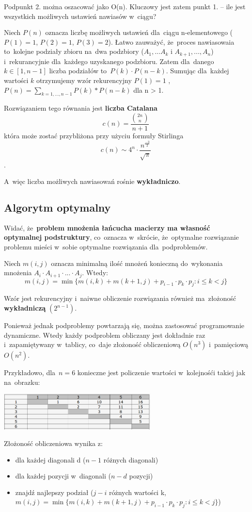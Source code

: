 Podpunkt 2. można oszacować jako O(n). Kluczowy jest zatem punkt 1. -- ile jest wszystkich możliwych ustawień nawiasów w~ciągu? 

Niech $P(n)$ oznacza liczbę możliwych ustawień dla~ciągu n-elementowego ($P(1) = 1$, $P(2) = 1$, $P(3) = 2$). Łatwo zauważyć, że~proces nawiasowaia to~kolejne podziały zbioru na~dwa podzbiory ($A_1,...A_k$ i $A_{k+1},...,A_n$) i~rekurancyjnie dla~każdego uzyskanego podzbioru. Zatem dla~danego $k \in [1, n-1]$ liczba podziałów to~$P(k) \cdot P(n - k)$. Sumując dla~każdej wartości $k$ otrzymujemy wzór rekurencyjny $P(1) = 1$ , $P(n) = \sum_{k=1,...,n-1} P(k) * P(n - k)$ dla n > 1.

Rozwiązaniem tego równania jest \textbf{liczba Catalana} $$ c(n) = \frac{{{2n} \choose {n}}}{n+1} $$ która może zostać przybliżona przy użyciu formuły Stirlinga $$ c(n) \sim  4^n \cdot \frac{n^{\frac{-3}{2}}}{\sqrt{\pi}} $$. 

A~więc liczba możliwych nawiasowań rośnie \textbf{wykładniczo}.

\subsection{Algorytm optymalny}

Widać, że~\textbf{problem mnożenia łańcucha macierzy ma własność optymalnej podstruktury}, co~oznacza w~skrócie, że~optymalne rozwiązanie problemu mieści w~sobie optymalne rozwiązania dla~podproblemów.

Niech $m(i,j)$ oznacza minimalną ilość mnożeń konieczną do~wykonania mnożenia $A_i \cdot A_{i+1} \cdot ... \cdot A_{j}$. Wtedy:
$$ m(i,j) = \min\{m(i,k) + m(k+1, j) + p_{i-1} \cdot p_k \cdot p_j : i \le k < j\}$$

Wzór jest rekurencyjny i~naiwne obliczenie rozwiązania również ma~złożoność \textbf{wykładniczą} $(2^{n-1})$.

Ponieważ jednak podproblemy powtarzają się, można zastosować programowanie dynamiczne. Wtedy każdy podproblem obliczany jest dokładnie raz i~zapamiętywany w~tablicy, co~daje złożoność obliczeniową $O(n^3)$ i~pamięciową $O(n^2)$.

Przykładowo, dla~$n=6$ konieczne jest policzenie wartości w~kolejnośći takiej jak na~obrazku:
\begin{center}
	\includegraphics[width=8cm]{03/diagon}
\end{center}
Złożoność obliczeniowa wynika z:
\begin{itemize}
	\item dla każdej diagonali d ($n - 1$ różnych diagonali)
	\item dla każdej pozycji w~diagonali ($n - d$ pozycji)
	\item znajdź najlepszy podział ($j - i$ różnych wartości k, $ m(i,j) = \min\{m(i,k) + m(k+1, j) + p_{i-1} \cdot p_k \cdot p_j : i \le k < j\}$)
\end{itemize}

